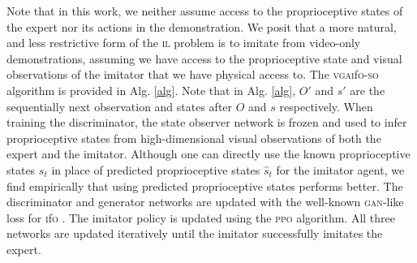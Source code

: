 \documentclass[letterpaper, 10 pt, conference]{ieeeconf}  %
\newcommand{\gaifo}{\textsc{gai}f\textsc{o}}
\newcommand{\ifo}{\textsc{i}f\textsc{o}}
\newcommand{\vgaifo}{\textsc{vgai}f\textsc{o}}
\newcommand{\vgaifoso}{\textsc{vgai}f\textsc{o}-\textsc{so}}
\newcommand{\ppo}{\textsc{ppo}}
\newcommand{\gan}{\textsc{gan}}
\newcommand{\il}{\textsc{il}}
\begin{document}
Note that in this work, we neither assume access to the proprioceptive states of the expert nor its actions in the demonstration. We posit that a more natural, and less restrictive form of the \il{} problem is to imitate from video-only demonstrations, assuming we have access to the proprioceptive state and visual observations of the imitator that we have physical access to. 
The \vgaifoso{} algorithm is provided in Alg. \ref{alg}. Note that in Alg. \ref{alg}, $O'$ and $s'$ are the sequentially next observation  and states after $O$ and $s$ respectively.
When training the discriminator, the state observer network is frozen and used to infer proprioceptive states from high-dimensional visual observations of both the expert and the imitator. Although one can directly use the known proprioceptive states $s_t$ in place of predicted proprioceptive states $\hat{s}_t$ for the imitator agent, we find empirically that using predicted proprioceptive states performs better. 
The discriminator and generator networks are updated with the well-known \gan{}-like loss for \ifo{} \cite{gaifo}. The imitator policy is updated using the \ppo{} \cite{ppo, ppoilya} algorithm. All three networks are updated iteratively until the imitator successfully imitates the expert. 
\end{document}
